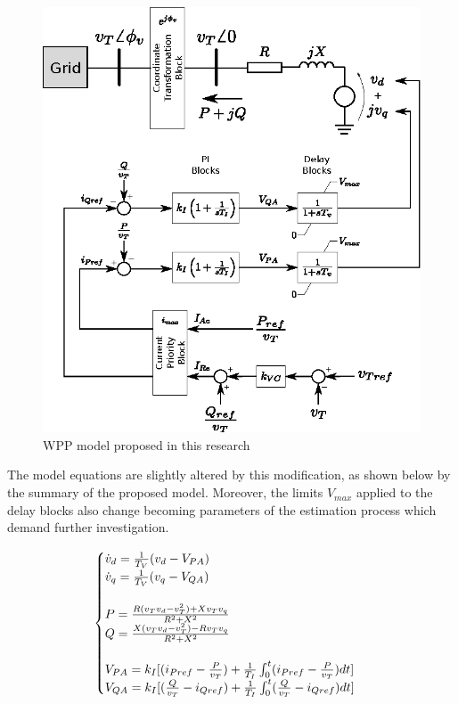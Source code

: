 \begin{figure}[h]
	\caption{WPP model proposed in this research}
	\begin{center}
		\includegraphics[scale=1]{Images/proposed_model.eps}
	\end{center}
	\label{fig: Proposed_Model}
\end{figure}

The model equations are slightly altered by this modification, as shown below by the summary of the proposed model. Moreover, the limits $V_{max}$ applied to the delay blocks also change becoming parameters of the estimation process which demand further investigation.

\begin{equation}
	\begin{cases}
		\dot{v}_{d} = \frac{1}{T_{V}}(v_{d} - V_{PA}) \\
		\dot{v}_{q} = \frac{1}{T_{V}}(v_{q} - V_{QA}) \\
		\\
		P = \frac{R(v_{T}v_{d} - v_{T}^{2}) + Xv_{T}v_{q}}{R^{2} + X^{2}} \\
		Q = \frac{X(v_{T}v_{d} - v_{T}^{2}) - Rv_{T}v_{q}}{R^{2} + X^{2}} \\
		\\
		V_{PA} = k_{I}[(i_{Pref} - \frac{P}{v_{T}}) + \frac{1}{T_{I}}\int\displaylimits_{0}^{t} (i_{Pref} - \frac{P}{v_{T}})dt]\\
		V_{QA} = k_{I}[(\frac{Q}{v_{T}} - i_{Qref}) + \frac{1}{T_{I}}\int\displaylimits_{0}^{t} (\frac{Q}{v_{T}} - i_{Qref})dt]
	\end{cases}
	\label{eq: summary_proposed}
\end{equation}

